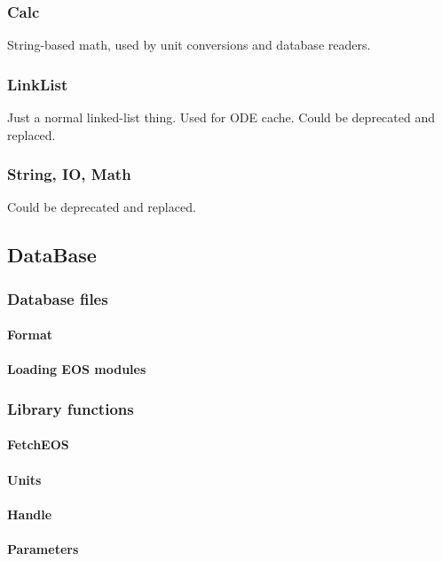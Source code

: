 \documentclass[twocolumn,10pt]{asme2ej}
\begin{document}
\subsubsection{Calc}
String-based math, used by unit conversions and database readers.

\subsubsection{LinkList}
Just a normal linked-list thing. Used for ODE cache. Could be deprecated and replaced.

\subsubsection{String, IO, Math}
Could be deprecated and replaced.

\subsection{DataBase}


\subsubsection{Database files}
\paragraph{Format}
\paragraph{Loading EOS modules}

\subsubsection{Library functions}
\paragraph{FetchEOS}
\paragraph{Units}
\paragraph{Handle}
\paragraph{Parameters}
\end{document}
